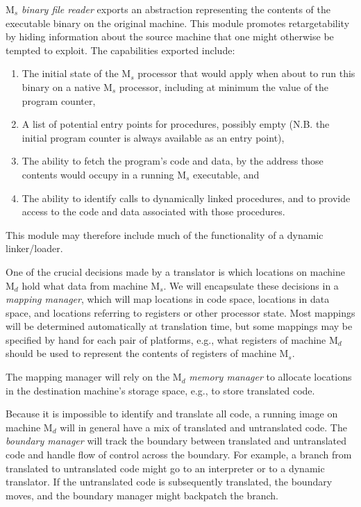 M$_s$ \emph{binary file reader} exports an abstraction
representing the contents of the executable binary on the original
machine.  This module promotes retargetability by hiding
information about the source machine that one might otherwise be
tempted to exploit.  The capabilities exported include:
\begin{enumerate}
\item The initial state of the M$_s$ processor that would apply when about
     to run this binary on a native M$_s$ processor, including at minimum
     the value of the program counter,
\item A list of potential entry points for procedures, possibly empty
     (N.B. the initial program counter is always available as an entry
     point), 
\item The ability to fetch the program's code and data, by the address
     those contents would occupy in a running M$_s$ executable, and 
\item The ability to identify calls to dynamically linked procedures, and
     to provide access to the code and data associated with those
     procedures.
\end{enumerate}
This module may therefore include much of the functionality of a dynamic
linker/loader.

One of the crucial decisions made by a translator is which locations
on machine M$_d$ hold what data from machine M$_s$.  We will encapsulate these
decisions in a \emph{mapping manager}, which will map locations in code
space, locations in data space, and locations referring to registers
or other processor state.  Most mappings will be determined
automatically at translation time, but some mappings may be specified
by hand for each pair of platforms, e.g., what registers of machine M$_d$
should be used to represent the contents of registers of machine M$_s$.

The mapping manager will rely on the M$_d$ \emph{memory manager} to allocate 
locations in the destination machine's storage space, e.g., to store 
translated code.

Because it is impossible to identify and translate all code, a running
image on machine M$_d$ will in general have a mix of translated and
untranslated code.  The \emph{boundary manager} will track the boundary
between translated and untranslated code and handle flow of control
across the boundary.  For example, a branch from translated to
untranslated code might go to an interpreter or to a dynamic
translator.  If the untranslated code is subsequently translated, the
boundary moves, and the boundary manager might backpatch the branch.

